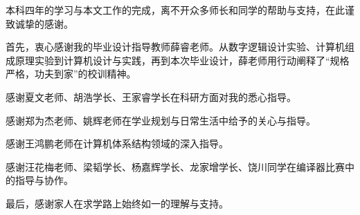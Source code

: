 \begin{acknowledgements}

本科四年的学习与本文工作的完成，离不开众多师长和同学的帮助与支持，在此谨致诚挚的感谢。

首先，衷心感谢我的毕业设计指导教师薛睿老师。从数字逻辑设计实验、计算机组成原理实验到计算机设计与实践，再到本次毕业设计，薛老师用行动阐释了“规格严格，功夫到家”的校训精神。

感谢夏文老师、胡浩学长、王家睿学长在科研方面对我的悉心指导。

感谢郑为杰老师、姚辉老师在学业规划与日常生活中给予的关心与指导。

感谢王鸿鹏老师在计算机体系结构领域的深入指导。

感谢汪花梅老师、梁韬学长、杨嘉辉学长、龙家增学长、饶川同学在编译器比赛中的指导与协作。

最后，感谢家人在求学路上始终如一的理解与支持。

\end{acknowledgements}
